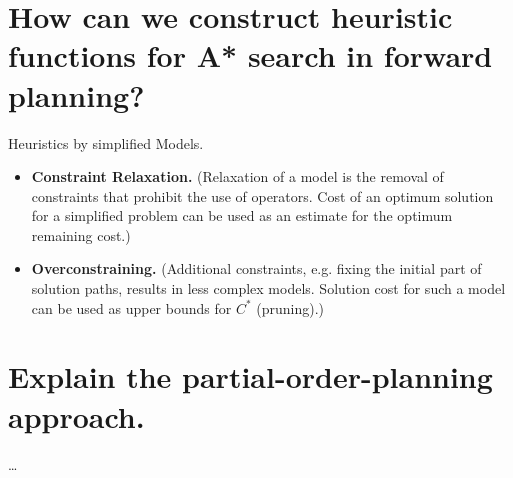 \documentclass[12pt, a4paper]{article}
\begin{document}
\section{How can we construct heuristic functions for A* search in forward planning?}
Heuristics by simplified Models. 
\begin{itemize}
\item \textbf{Constraint Relaxation.} (Relaxation of a model is the removal of constraints that prohibit the use of operators. Cost of an optimum solution for a simplified problem can be used as an estimate for the optimum remaining cost.)
\item \textbf{Overconstraining.} (Additional constraints, e.g. fixing the initial part of solution paths, results in less complex models. Solution cost for such a model can be used as upper bounds for $C^*$ (pruning).)
\end{itemize}

\section{Explain the partial-order-planning approach.}
\ldots
\end{document}

